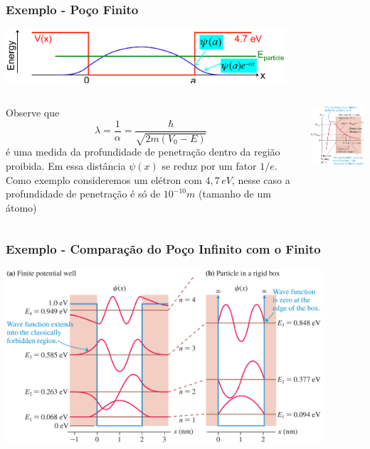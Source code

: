 \documentclass[12pt,brazil,table]{beamer}
\begin{document}
\begin{frame}
  \frametitle{Exemplo - Poço Finito}
  \fontsize{9pt}{11pt}\selectfont
  
  \begin{center}
  \includegraphics[height=2cm]{figuras/fig22b} 
  \end{center}

  \begin{columns}
  
    Observe que
  \[
   \lambda = \dfrac{1}{\alpha} = \dfrac{\hbar}{\sqrt{2m\left(V_0 - E\right)}}
  \]
  é uma medida da profundidade de penetração dentro da região proibida.  Em essa distância $\psi (x)$ se reduz por um fator $1/e$.\\
  
  Como exemplo consideremos um elétron com $4,7\,eV$, nesse caso a profundidade de penetração é só de $10^{-10}m$ (tamanho de um átomo)
    
    
      \includegraphics[width=4cm]{figuras/fig22c}
  \end{columns} 
  
\end{frame}




\begin{frame}
  \frametitle{Exemplo - Comparação do Poço Infinito com o Finito}
  \fontsize{10pt}{11pt}\selectfont
  
   \centering \includegraphics[height=6.5cm]{figuras/fig23}
 
\end{frame}
\end{document}
